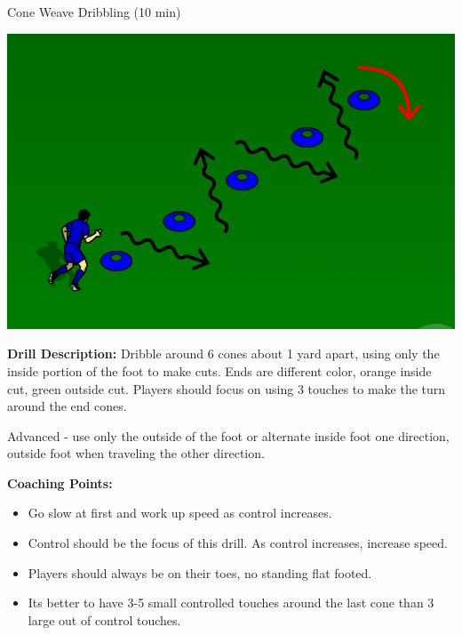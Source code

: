 \begin{evenBlock}{Cone Weave Dribbling (10 min)}


\begin{minipage}[t]{\linewidth}
    \centering
    
    \begin{minipage}{.3\linewidth} %
        \includegraphics[width=\textwidth]{../img/Trimmed/cone_dribbling}
    \end{minipage}
    \hspace{0.05\linewidth}
    \begin{minipage}{.6\linewidth} %
        \textbf{Drill Description:}
        Dribble around 6 cones about 1 yard apart, using only the inside portion of the foot to make cuts.  Ends are different color, orange inside cut, green outside cut.  Players should focus on using 3 touches to make the turn around the end cones.

        \vspace{3pt}
        
        Advanced - use only the outside of the foot or alternate inside foot one direction, outside foot when traveling the other direction.

        \vspace{10pt}
        
        \textbf{Coaching Points:}
        \begin{itemize}
        \setlength{\itemsep}{0pt}
        \setlength{\parskip}{0pt}
        \setlength{\parsep}{0pt}
        \item Go slow at first and work up speed as control increases.
        \item Control should be the focus of this drill.  As control increases, increase speed.
        \item Players should always be on their toes, no standing flat footed.
        \item Its better to have 3-5 small controlled touches around the last cone than 3 large out of control touches.
        \end{itemize}

    \end{minipage}
\end{minipage}

\end{evenBlock}